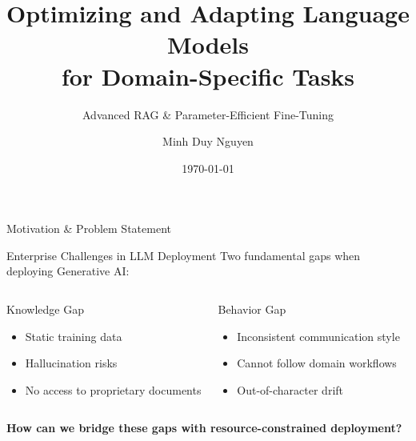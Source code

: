 \documentclass[aspectratio=169]{beamer}
\title[Optimizing LMs for Domain-Specific Tasks]{Optimizing and Adapting Language Models \\ for Domain-Specific Tasks}
\subtitle{Advanced RAG \& Parameter-Efficient Fine-Tuning}
\author{Minh Duy Nguyen}
\institute{Torus AI \\ Supervised by: [Supervisor Names]}
\date{\today}
\begin{document}
\begin{frame}
\titlepage
\end{frame}

\begin{frame}{Motivation \& Problem Statement}
\begin{block}{Enterprise Challenges in LLM Deployment}
Two fundamental gaps when deploying Generative AI:
\end{block}

\begin{columns}[T]
\begin{alertblock}{Knowledge Gap}
\begin{itemize}
    \item Static training data
    \item Hallucination risks
    \item No access to proprietary documents
\end{itemize}
\end{alertblock}

\begin{alertblock}{Behavior Gap}
\begin{itemize}
    \item Inconsistent communication style
    \item Cannot follow domain workflows
    \item Out-of-character drift
\end{itemize}
\end{alertblock}
\end{columns}

\vspace{0.5cm}
\begin{center}
\textbf{How can we bridge these gaps with resource-constrained deployment?}
\end{center}
\end{frame}
\end{document}
